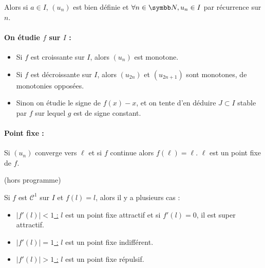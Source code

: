 Alors si $a \in I$, $(u_n)$ est bien définie et $\forall n \in \N, u_n \in I$ par récurrence 
sur $n$. 

\paragraph{On étudie $f$ sur $I$ :}
\begin{itemize}
    \item Si $f$ est croissante sur $I$, alors $(u_n)$ est monotone.
    \item Si $f$ est décroissante sur $I$, alors $(u_{2n})$ et $(u_{2n + 1})$ sont monotones, de 
        monotonies opposées.
    \item Sinon on étudie le signe de $f(x) - x$, et on tente d'en déduire $J \subset I$ stable
        par $f$ sur lequel $g$ est de signe constant. 
\end{itemize}

\paragraph{Point fixe :}
Si $(u_n)$ converge vers $\ell$ et si $f$ continue alors $f(\ell) = \ell$. $\ell$ est un point fixe de $f$. \\

\begin{remarque}
    (hors programme)

    Si $f$ est $\mathscr C^1$ sur $I$ et $f(l) = l$, alors il y a plusieurs cas : 

    \begin{itemize}
        \item \uline{$|f'(l)| < 1$ :}
         $l$ est un point fixe attractif et si $f'(l) = 0$, il est super attractif. 

        \item \uline{$|f'(l)| = 1$ :}
        $l$ est un point fixe indifférent. 

        \item \uline{$|f'(l)| > 1$ :}
        $l$ est un point fixe répulsif.
    \end{itemize}
\end{remarque}

